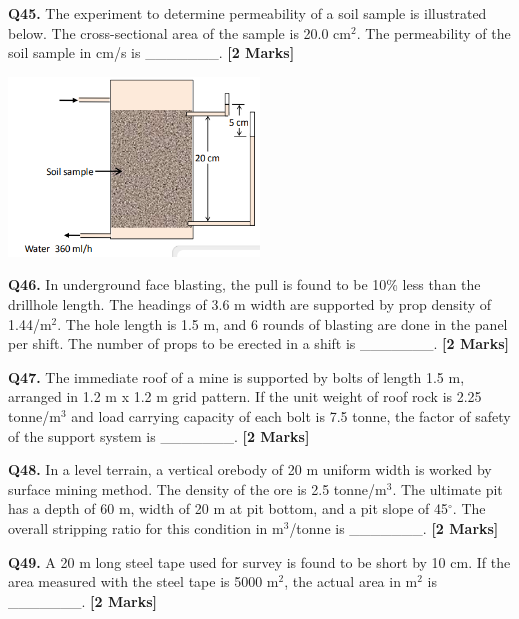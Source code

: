 \documentclass[11pt]{article}
\newcommand{\questionb}[2]{
    \noindent\textbf{Q#2.} #1 \hfill \textbf{[2 Marks]}
}
\begin{document}
\questionb{The experiment to determine permeability of a soil sample is illustrated below. The cross-sectional area of the sample is 20.0 cm\(^2\). The permeability of the soil sample in cm/s is \_\_\_\_\_\_\_.}{45}
\begin{center}
\includegraphics[width=0.5\textwidth]{figures/45.png}
\end{center}
\vspace{0.5cm}

\questionb{In underground face blasting, the pull is found to be 10\% less than the drillhole length. The headings of 3.6 m width are supported by prop density of 1.44/m\(^2\). The hole length is 1.5 m, and 6 rounds of blasting are done in the panel per shift. The number of props to be erected in a shift is \_\_\_\_\_\_\_.}{46}
\vspace{0.5cm}

\questionb{The immediate roof of a mine is supported by bolts of length 1.5 m, arranged in 1.2 m x 1.2 m grid pattern. If the unit weight of roof rock is 2.25 tonne/m\(^3\) and load carrying capacity of each bolt is 7.5 tonne, the factor of safety of the support system is \_\_\_\_\_\_\_.}{47}
\vspace{0.5cm}

\questionb{In a level terrain, a vertical orebody of 20 m uniform width is worked by surface mining method. The density of the ore is 2.5 tonne/m\(^3\). The ultimate pit has a depth of 60 m, width of 20 m at pit bottom, and a pit slope of 45\(^\circ\). The overall stripping ratio for this condition in m\(^3\)/tonne is \_\_\_\_\_\_\_.}{48}
\vspace{0.5cm}

\questionb{A 20 m long steel tape used for survey is found to be short by 10 cm. If the area measured with the steel tape is 5000 m\(^2\), the actual area in m\(^2\) is \_\_\_\_\_\_\_.}{49}
\vspace{0.5cm}
\end{document}
